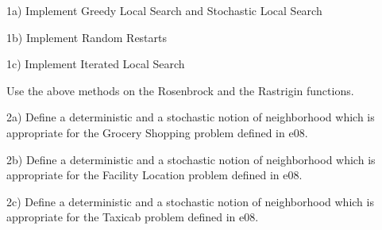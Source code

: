 

\renewcommand{\course}{Optimization}
\renewcommand{\coursepicture}{optim}
\renewcommand{\coursedate}{Summer 2015}
\renewcommand{\exnum}{10}

\exercises
{}
\exercisestitle



1a) Implement Greedy Local Search and Stochastic Local Search

1b) Implement Random Restarts

1c) Implement Iterated Local Search

Use the above methods on the Rosenbrock and the Rastrigin functions.



2a) Define a deterministic and a stochastic notion of neighborhood which is
appropriate for the Grocery Shopping problem defined in e08.

2b) Define a deterministic and a stochastic notion of neighborhood which is
appropriate for the Facility Location problem defined in e08.

2c) Define a deterministic and a stochastic notion of neighborhood which is
appropriate for the Taxicab problem defined in e08.

\exerfoot
